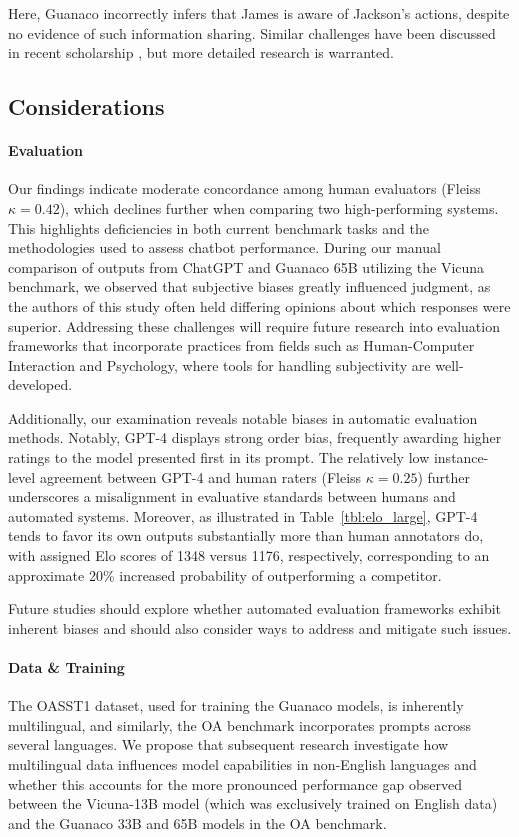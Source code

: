 Here, {Guanaco} incorrectly infers that James is aware of Jackson’s actions, despite no evidence of such information sharing. Similar challenges have been discussed in recent scholarship \cite{sap2022neural}, but more detailed research is warranted.

\subsection{Considerations}
\label{ssec:considerations}

\paragraph{Evaluation}

Our findings indicate moderate concordance among human evaluators (Fleiss $\kappa=0.42$), which declines further when comparing two high-performing systems. This highlights deficiencies in both current benchmark tasks and the methodologies used to assess chatbot performance. During our manual comparison of outputs from ChatGPT and {Guanaco} 65B utilizing the Vicuna benchmark, we observed that subjective biases greatly influenced judgment, as the authors of this study often held differing opinions about which responses were superior. Addressing these challenges will require future research into evaluation frameworks that incorporate practices from fields such as Human-Computer Interaction and Psychology, where tools for handling subjectivity are well-developed.

Additionally, our examination reveals notable biases in automatic evaluation methods. Notably, GPT-4 displays strong order bias, frequently awarding higher ratings to the model presented first in its prompt. The relatively low instance-level agreement between GPT-4 and human raters (Fleiss $\kappa=0.25$) further underscores a misalignment in evaluative standards between humans and automated systems. Moreover, as illustrated in Table~\ref{tbl:elo_large}, GPT-4 tends to favor its own outputs substantially more than human annotators do, with assigned Elo scores of 1348 versus 1176, respectively, corresponding to an approximate 20\% increased probability of outperforming a competitor.

Future studies should explore whether automated evaluation frameworks exhibit inherent biases and should also consider ways to address and mitigate such issues.

\paragraph{Data \& Training} The OASST1 dataset, used for training the {Guanaco} models, is inherently multilingual, and similarly, the OA benchmark incorporates prompts across several languages. We propose that subsequent research investigate how multilingual data influences model capabilities in non-English languages and whether this accounts for the more pronounced performance gap observed between the Vicuna-13B model (which was exclusively trained on English data) and the {Guanaco} 33B and 65B models in the OA benchmark.

